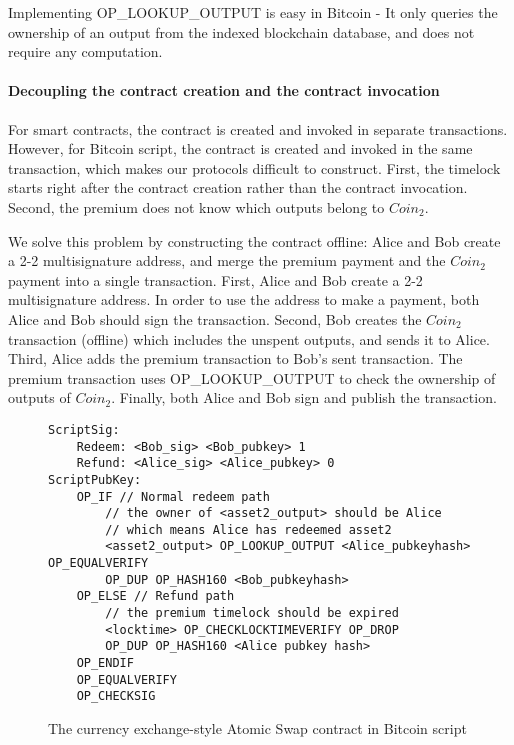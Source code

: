 Implementing OP\_LOOKUP\_OUTPUT is easy in Bitcoin - It only queries the ownership of an output from the indexed blockchain database, and does not require any computation.

\paragraph{Decoupling the contract creation and the contract invocation}
For smart contracts, the contract is created and invoked in separate transactions.
However, for Bitcoin script, the contract is created and invoked in the same transaction, which makes our protocols difficult to construct.
First, the timelock starts right after the contract creation rather than the contract invocation.
Second, the premium does not know which outputs belong to $Coin_2$.

We solve this problem by constructing the contract offline:
Alice and Bob create a 2-2 multisignature address, and merge the premium payment and the $Coin_2$ payment into a single transaction.
First, Alice and Bob create a 2-2 multisignature address.
In order to use the address to make a payment, both Alice and Bob should sign the transaction.
Second, Bob creates the $Coin_2$ transaction (offline) which includes the unspent outputs, and sends it to Alice.
Third, Alice adds the premium transaction to Bob's sent transaction.
The premium transaction uses OP\_LOOKUP\_OUTPUT to check the ownership of outputs of $Coin_2$.
Finally, both Alice and Bob sign and publish the transaction.

\begin{figure}
\begin{lstlisting}[language=Solidity, basicstyle=\tiny]
ScriptSig:
    Redeem: <Bob_sig> <Bob_pubkey> 1
    Refund: <Alice_sig> <Alice_pubkey> 0
ScriptPubKey:
    OP_IF // Normal redeem path
        // the owner of <asset2_output> should be Alice
        // which means Alice has redeemed asset2
        <asset2_output> OP_LOOKUP_OUTPUT <Alice_pubkeyhash> OP_EQUALVERIFY 
        OP_DUP OP_HASH160 <Bob_pubkeyhash>
    OP_ELSE // Refund path
        // the premium timelock should be expired
        <locktime> OP_CHECKLOCKTIMEVERIFY OP_DROP
        OP_DUP OP_HASH160 <Alice pubkey hash>
    OP_ENDIF
    OP_EQUALVERIFY
    OP_CHECKSIG
\end{lstlisting}
\label{code:bitcoin_contract_currency_exchange}
\caption{The currency exchange-style Atomic Swap contract in Bitcoin script}
\end{figure}

